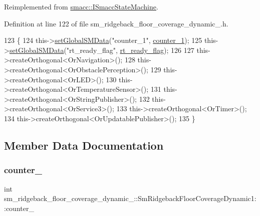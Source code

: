 Reimplemented from \hyperlink{classsmacc_1_1ISmaccStateMachine_ac2982c6c8283663e5e1e8a7c82f511ec}{smacc\+::\+I\+Smacc\+State\+Machine}.



Definition at line 122 of file sm\+\_\+ridgeback\+\_\+floor\+\_\+coverage\+\_\+dynamic\+\_.\+h.


\begin{DoxyCode}
123     \{
124         this->\hyperlink{classsmacc_1_1ISmaccStateMachine_a8588f9e580fbb95b53e2bd2ca3ff1f98}{setGlobalSMData}(\textcolor{stringliteral}{"counter\_1"}, \hyperlink{structsm__ridgeback__floor__coverage__dynamic__1_1_1SmRidgebackFloorCoverageDynamic1_aa47eb8f17a6730dcae3a8be34510f8bf}{counter\_1});
125         this->\hyperlink{classsmacc_1_1ISmaccStateMachine_a8588f9e580fbb95b53e2bd2ca3ff1f98}{setGlobalSMData}(\textcolor{stringliteral}{"rt\_ready\_flag"}, \hyperlink{structsm__ridgeback__floor__coverage__dynamic__1_1_1SmRidgebackFloorCoverageDynamic1_aa54392c38d6cbe8a6637f94a85293949}{rt\_ready\_flag});
126 
127         this->createOrthogonal<OrNavigation>();
128         this->createOrthogonal<OrObstaclePerception>();
129         this->createOrthogonal<OrLED>();
130         this->createOrthogonal<OrTemperatureSensor>();
131         this->createOrthogonal<OrStringPublisher>();
132         this->createOrthogonal<OrService3>();
133         this->createOrthogonal<OrTimer>();
134         this->createOrthogonal<OrUpdatablePublisher>();
135     \}
\end{DoxyCode}


\subsection{Member Data Documentation}
\mbox{\label{structsm__ridgeback__floor__coverage__dynamic__1_1_1SmRidgebackFloorCoverageDynamic1_aa47eb8f17a6730dcae3a8be34510f8bf}} 
\subsubsection{\texorpdfstring{counter\+\_}{counter\_1}}
{\footnotesize\ttfamily int sm\+\_\+ridgeback\+\_\+floor\+\_\+coverage\+\_\+dynamic\+\_\+::\+Sm\+Ridgeback\+Floor\+Coverage\+Dynamic1\+::counter\+\_}



